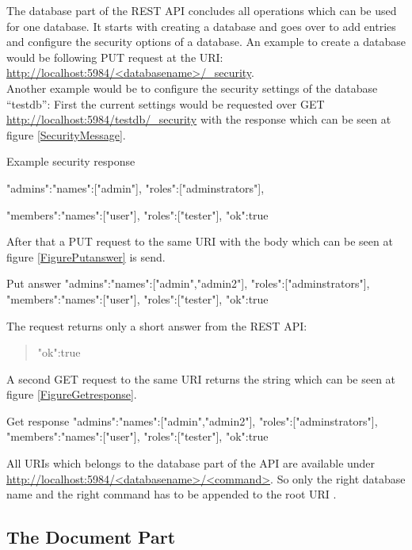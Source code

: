 The database part of the REST API concludes all operations which can be used for one database. It starts with creating a database and goes over to add entries and configure the security options of a database.
An example to create a database would be following PUT request at the URI:
\url{http://localhost:5984/<databasename>/_security}. \\
Another example would be to configure the security settings of the database “testdb”:
First the current settings would be requested over GET  \url{http://localhost:5984/testdb/_security} with the response which can be seen at figure \ref{SecurityMessage}.
\begin{mylisting}{\label{SecurityMessage}Example security response}
{
    {
        "admins":{"names":["admin"],
        "roles":["adminstrators"]},
        
        "members":{"names":["user"],
        "roles":["tester"]},
        "ok":true
    }
}
\end{mylisting} 
\newpage 
After that a PUT request to the same URI with the body which can be seen at figure \ref{FigurePutanswer} is send.
\begin{mylisting}{\label{FigurePutanswer} Put answer}
{
    {
        "admins":{"names":["admin","admin2"],
        "roles":["adminstrators"]},
        "members":{"names":["user"],
        "roles":["tester"]},
        "ok":true
    } 
}
\end{mylisting}
The request returns only a short answer from the REST API:\begin{quote}{"ok":true} \end{quote}
A second GET request to the same URI returns the string which can be seen at figure \ref{FigureGetresponse}. 
\begin{mylisting}{\label{FigureGetresponse} Get response}
{
    {
        "admins":{"names":["admin","admin2"],
        "roles":["adminstrators"]},
        "members":{"names":["user"],
        "roles":["tester"]},
        "ok":true
    }
}
\end{mylisting}
All URIs which belongs to the database part of the API are available under  \url{http://localhost:5984/<databasename>/<command>}. So only the right database name and the right command has to be appended to the root URI \parencite{CouchDBRestDatabases}.

\subsection{The Document Part}

